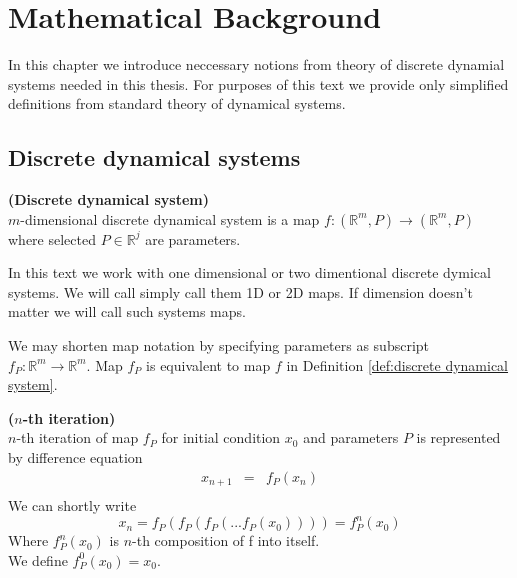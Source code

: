 \chapter{Mathematical Background}
In this chapter we introduce neccessary notions from theory of discrete dynamial systems needed in this thesis.
For purposes of this text we provide only simplified definitions from standard theory of dynamical systems.

\section{Discrete dynamical systems}

\begin{definition} \textbf{(Discrete dynamical system)} \\
    \label{def:discrete dynamical system}
    $m$-dimensional discrete dynamical system is a map $f: (\mathbb{R}^{m}, P) \rightarrow (\mathbb{R}^{m}, P)$ where selected $P \in \mathbb{R}^j$ are parameters.
\end{definition}

\begin{remark}
    In this text we work with one dimensional or two dimentional discrete dymical systems.
    We will call simply call them 1D or 2D maps.
    If dimension doesn't matter we will call such systems maps.
\end{remark}

\begin{remark}
    We may shorten map notation by specifying parameters as subscript $f_P: \mathbb{R}^m \rightarrow \mathbb{R}^m$.
    Map $f_P$ is equivalent to map $f$ in Definition \ref{def:discrete dynamical system}.
\end{remark}

\begin{definition} \textbf{($n$-th iteration)} \\
    $n$-th iteration of map $f_P$ for initial condition $x_0$ and parameters $P$ is represented by difference equation
    \begin{eqnarray}
        x_{n+1}  & = & f_P(x_{n}) \\
    \end{eqnarray}
    We can shortly write
    \begin{equation}
        x_{n} = f_P(f_P(f_P(...f_P(x_0)))) = f^{n}_{P}(x_0) \nonumber
    \end{equation}
    Where $f^{n}_{P}(x_0)$ is $n$-th composition of f into itself. \\
    We define $f^{0}_{P}(x_0) = x_0$.
\end{definition}

